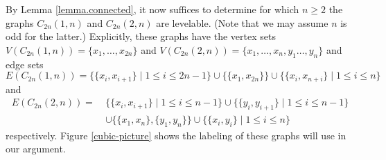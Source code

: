 \documentclass[12pt]{amsart}
\numberwithin{equation}{section}
\theoremstyle{definition}
\newcounter{i} %
\begin{document}
By Lemma \ref{lemma.connected}, it now suffices to determine for which $n \geq 2$ the graphs $C_{2n}(1,n)$ and $C_{2n}(2,n)$ are levelable. (Note that we may assume $n$ is odd for the latter.) Explicitly, these graphs have the vertex sets $V(C_{2n}(1,n))=\{x_1,\dots,x_{2n}\}$ and $V(C_{2n}(2,n))=\{x_1,\dots,x_{n},y_1\dots,y_n\}$ and edge sets
\[
E(C_{2n}(1,n))=\{\{x_i,x_{i+1}\}\mid 1\leq i \leq 2n-1\} \cup \{\{x_1,x_{2n}\}\} \cup \{\{x_i,x_{n+i}\} \mid 1\leq i\leq n\}
\]
and
\begin{align*}
E(C_{2n}(2,n)) =~&\{\{x_i,x_{i+1}\}\mid 1\leq i \leq n-1\} \cup \{\{y_i,y_{i+1}\}\mid 1\leq i \leq n-1\} \\
& \cup \{\{x_1,x_{n}\},\{y_1,y_{n}\}\} \cup \{\{x_i,y_{i}\} \mid 1\leq i\leq n\}
\end{align*}
respectively. Figure \ref{cubic-picture} shows the labeling of these graphs will use in our argument.
\end{document}
